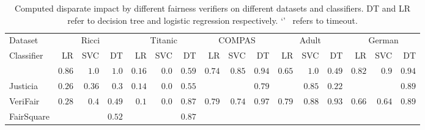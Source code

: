 \begin{table}[t!]
	\centering
	\setlength{\tabcolsep}{.3em}
	\begin{tabular}{lrrrrrrrrrrrrrrr}
		\toprule
		Dataset   & \multicolumn{3}{c}{Ricci} & \multicolumn{3}{c}{Titanic} & \multicolumn{3}{c}{COMPAS} &  \multicolumn{3}{c}{Adult} &
		\multicolumn{3}{c}{German} \\ 
		
		\cmidrule(lr){2-4}
		\cmidrule(lr){5-7}
		\cmidrule(lr){8-10}
		\cmidrule(lr){11-13}
		
		
		Classifier & 
		LR & SVC & DT &
		LR & SVC & DT &
		LR & SVC & DT &
		LR & SVC & DT &
		LR & SVC & DT \\
		\midrule
		
		{\framework} &  $ 0.86 $  &  $ 1.0 $  &  $ 1.0 $  &  $ 0.16 $  &  $ 0.0 $  &  $ 0.59 $  &  $ 0.74 $  &  $ 0.85 $  &  $ 0.94 $  &  $ 0.65 $  &  $ 1.0 $  &  $ 0.49 $  &  $ 0.82 $  &  $ 0.9 $  &  $ 0.94 $  \\ 
		Justicia &  $ 0.26 $  &  $ 0.36 $  &  $ 0.3 $  &  $ 0.14 $  &  $ 0.0 $  &  $ 0.55 $  & \textemdash & \textemdash &  $ 0.79 $  & \textemdash &  $ 0.85 $  &  $ 0.22 $  & \textemdash & \textemdash &  $ 0.89 $  \\ 
		VeriFair &  $ 0.28 $  &  $ 0.4 $  &  $ 0.49 $  &  $ 0.1 $  &  $ 0.0 $  &  $ 0.87 $  &  $ 0.79 $  &  $ 0.74 $  &  $ 0.97 $  &  $ 0.79 $  &  $ 0.88 $  &  $ 0.93 $  &  $ 0.66 $  &  $ 0.64 $  &  $ 0.89 $  \\ 
		FairSquare & \textemdash & \textemdash &  $ 0.52 $  & \textemdash & \textemdash &  $ 0.87 $  & \textemdash & \textemdash & \textemdash & \textemdash & \textemdash & \textemdash & \textemdash & \textemdash & \textemdash \\ 
		
		
		
		
		
		
		
		
		
		
		
		
		
		
		
	\end{tabular}
	\caption{Computed disparate impact by different fairness verifiers on different datasets and classifiers.  DT and LR refer to decision tree and logistic regression respectively. `\textemdash'~ refers to timeout.}
	\label{tab:FS_VF_Justicia}
\end{table}